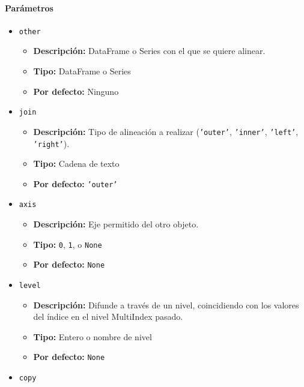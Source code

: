         \paragraph{\textbf{Parámetros}}
        \begin{itemize}
            \item \texttt{other}
                \begin{itemize}
                    \item \textbf{Descripción:} DataFrame o Series con el que se quiere alinear.
                    \item \textbf{Tipo:} DataFrame o Series
                    \item \textbf{Por defecto:} Ninguno
                \end{itemize}
            \item \texttt{join}
                \begin{itemize}
                    \item \textbf{Descripción:} Tipo de alineación a realizar (\texttt{'outer'}, \texttt{'inner'}, \texttt{'left'}, \texttt{'right'}).
                    \item \textbf{Tipo:} Cadena de texto
                    \item \textbf{Por defecto:} \texttt{'outer'}
                \end{itemize}
            \item \texttt{axis}
                \begin{itemize}
                    \item \textbf{Descripción:} Eje permitido del otro objeto.
                    \item \textbf{Tipo:} \texttt{0}, \texttt{1}, o \texttt{None}
                    \item \textbf{Por defecto:} \texttt{None}
                \end{itemize}
            \item \texttt{level}
                \begin{itemize}
                    \item \textbf{Descripción:} Difunde a través de un nivel, coincidiendo con los valores del índice en el nivel MultiIndex pasado.
                    \item \textbf{Tipo:} Entero o nombre de nivel
                    \item \textbf{Por defecto:} \texttt{None}
                \end{itemize}
            \item \texttt{copy}

\end{itemize}
